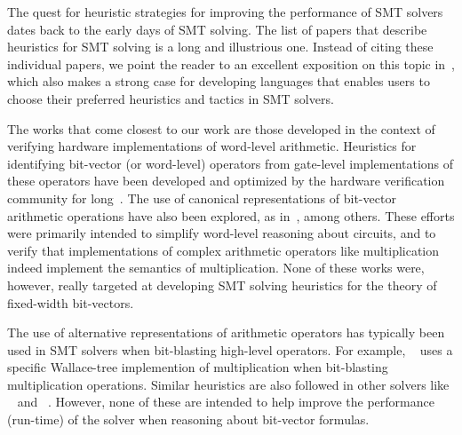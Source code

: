 


The quest for heuristic strategies for improving the performance of
SMT solvers dates back to the early days of SMT solving.  The list of
papers that describe heuristics for SMT solving is a long and
illustrious one.  Instead of citing these individual papers, we point
the reader to an excellent exposition on this topic
in~\cite{deMoura2013}, which also makes a strong case for developing
languages that enables users to choose their preferred heuristics and
tactics in SMT solvers.

The works that come closest to our work are those developed in the
context of verifying hardware implementations of word-level
arithmetic.  Heuristics for identifying bit-vector (or word-level)
operators from gate-level implementations of these operators have been
developed and optimized by the hardware verification community for
long~\cite{kunz,ciesielski,reveng,earlier-pat-match-synopsys}.  The
use of canonical representations of bit-vector arithmetic operations
have also been explored, as in~\cite{bmd,drechsler}, among others.
These efforts were primarily intended to simplify word-level reasoning
about circuits, and to verify that implementations of complex
arithmetic operators like multiplication indeed implement the
semantics of multiplication.  None of these works were, however,
really targeted at developing SMT solving heuristics for the theory of
fixed-width bit-vectors.

The use of alternative representations of arithmetic operators has
typically been used in SMT solvers when bit-blasting high-level
operators.  For example, {\zthree}~\cite{zthree} uses a specific
Wallace-tree implemention of multiplication when bit-blasting
multiplication operations.  Similar heuristics are also followed in
other solvers like {\boolector}~\cite{boolector} and
{\cvcfour}~\cite{cvcfour}.  However, none of these are intended to
help improve the performance (run-time) of the solver when reasoning
about bit-vector formulas. 
